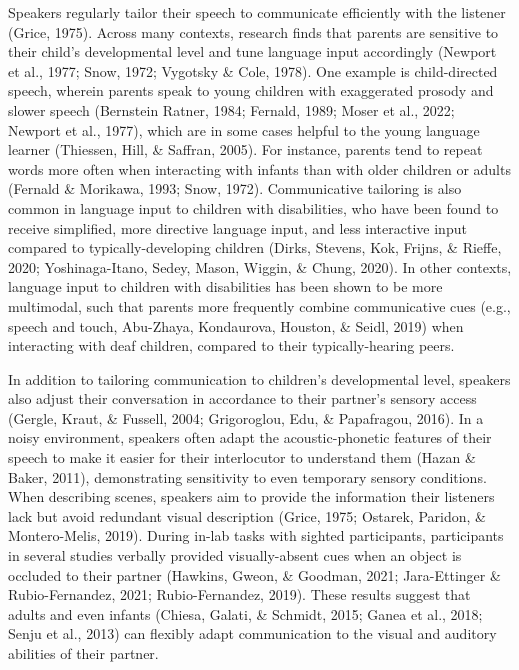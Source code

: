 \documentclass[
  man]{apa6}
\begin{document}
Speakers regularly tailor their speech to communicate efficiently with the listener (Grice, 1975). Across many contexts, research finds that parents are sensitive to their child's developmental level and tune language input accordingly (Newport et al., 1977; Snow, 1972; Vygotsky \& Cole, 1978). One example is child-directed speech, wherein parents speak to young children with exaggerated prosody and slower speech (Bernstein Ratner, 1984; Fernald, 1989; Moser et al., 2022; Newport et al., 1977), which are in some cases helpful to the young language learner (Thiessen, Hill, \& Saffran, 2005). For instance, parents tend to repeat words more often when interacting with infants than with older children or adults (Fernald \& Morikawa, 1993; Snow, 1972). Communicative tailoring is also common in language input to children with disabilities, who have been found to receive simplified, more directive language input, and less interactive input compared to typically-developing children (Dirks, Stevens, Kok, Frijns, \& Rieffe, 2020; Yoshinaga-Itano, Sedey, Mason, Wiggin, \& Chung, 2020). In other contexts, language input to children with disabilities has been shown to be more multimodal, such that parents more frequently combine communicative cues (e.g., speech and touch, Abu-Zhaya, Kondaurova, Houston, \& Seidl, 2019) when interacting with deaf children, compared to their typically-hearing peers.

In addition to tailoring communication to children's developmental level, speakers also adjust their conversation in accordance to their partner's sensory access (Gergle, Kraut, \& Fussell, 2004; Grigoroglou, Edu, \& Papafragou, 2016). In a noisy environment, speakers often adapt the acoustic-phonetic features of their speech to make it easier for their interlocutor to understand them (Hazan \& Baker, 2011), demonstrating sensitivity to even temporary sensory conditions. When describing scenes, speakers aim to provide the information their listeners lack but avoid redundant visual description (Grice, 1975; Ostarek, Paridon, \& Montero-Melis, 2019). During in-lab tasks with sighted participants, participants in several studies verbally provided visually-absent cues when an object is occluded to their partner (Hawkins, Gweon, \& Goodman, 2021; Jara-Ettinger \& Rubio-Fernandez, 2021; Rubio-Fernandez, 2019). These results suggest that adults and even infants (Chiesa, Galati, \& Schmidt, 2015; Ganea et al., 2018; Senju et al., 2013) can flexibly adapt communication to the visual and auditory abilities of their partner.
\end{document}
